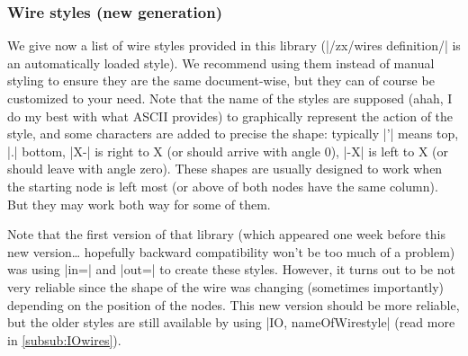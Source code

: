 \documentclass[a4paper,doc2]{ltxdoc} %
\begin{document}
{\subsubsection{Wire styles (new generation)}

We give now a list of wire styles provided in this library (|/zx/wires definition/| is an automatically loaded style). We recommend using them instead of manual styling to ensure they are the same document-wise, but they can of course be customized to your need. Note that the name of the styles are supposed (ahah, I do my best with what ASCII provides) to graphically represent the action of the style, and some characters are added to precise the shape: typically |'| means top, |.| bottom, |X-| is right to X (or should arrive with angle 0), |-X| is left to X (or should leave with angle zero). These shapes are usually designed to work when the starting node is left most (or above of both nodes have the same column). But they may work both way for some of them.

Note that the first version of that library (which appeared one week before this new version\dots{} hopefully backward compatibility won't be too much of a problem) was using |in=| and |out=| to create these styles. However, it turns out to be not very reliable since the shape of the wire was changing (sometimes importantly) depending on the position of the nodes. This new version should be more reliable, but the older styles are still available by using |IO, nameOfWirestyle| (read more in \cref{subsub:IOwires}).

}
\end{document}
